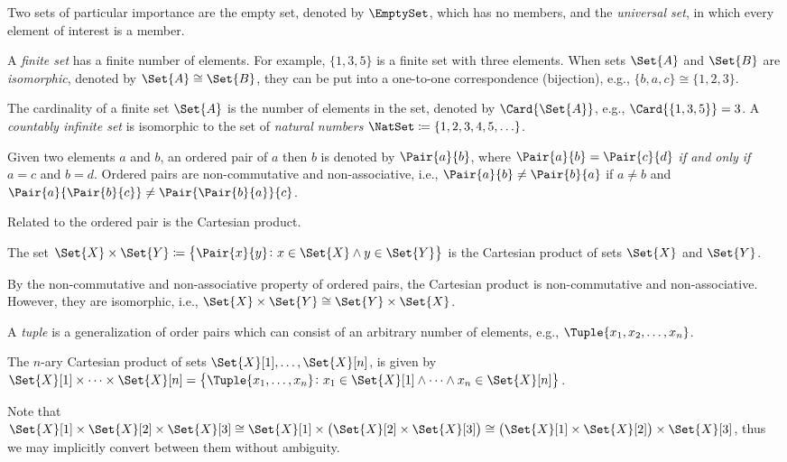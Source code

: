 \documentclass[10pt,final,hidelinks]{article}
\numberwithin{equation}{section}
\begin{document}
Two sets of particular importance are the empty set, denoted by $\EmptySet$, which has no members, and the \emph{universal set}, in which every element of interest is a member.

A \emph{finite set} has a finite number of elements.
For example, $\{ 1, 3, 5 \}$ is a finite set with three elements.
When sets $\Set{A}$ and $\Set{B}$ are \emph{isomorphic}, denoted by $\Set{A} 
\cong \Set{B}$, they can be put into a one-to-one correspondence (bijection), e.g., $\{b,a,c\} \cong \{1,2,3\}$.

The cardinality of a finite set $\Set{A}$ is the number of elements in the set, denoted by $\Card{\Set{A}}$, e.g., $\Card{\left\{ 1, 3, 5\right\}} = 3$.
A \emph{countably infinite set} is isomorphic to the set of \emph{natural numbers} $\NatSet \coloneqq \{1,2,3,4,5,\ldots\}$.


Given two elements $a$ and $b$, an ordered pair of $a$ then $b$ is denoted by $\Pair{a}{b}$, where $\Pair{a}{b} = \Pair{c}{d}$ \emph{if and only if} $a = c$ and $b = d$.
Ordered pairs are non-commutative and non-associative, i.e., $\Pair{a}{b} \neq \Pair{b}{a}$ if $a \neq b$ and $\Pair{a}{\Pair{b}{c}} \neq \Pair{\Pair{b}{a}}{c}$.

Related to the ordered pair is the Cartesian product.
\begin{definition}
	The set $\Set{X} \times \Set{Y} \coloneqq \left\{\Pair{x}{y} \colon x \in 
	\Set{X} \land y \in \Set{Y}\right\}$ is the Cartesian product of sets $\Set{X}$ 
	and $\Set{Y}$.
\end{definition}
By the non-commutative and non-associative property of ordered pairs, the Cartesian product is non-commutative and non-associative.
However, they are isomorphic, i.e., $\Set{X} \times \Set{Y} \cong \Set{Y} \times \Set{X}$.

A \emph{tuple} is a generalization of order pairs which can consist of an arbitrary number of elements, e.g., $\Tuple{x_1,x_2,\ldots,x_n}$.
\begin{definition}
	The $n$-ary Cartesian product of sets $\Set{X}[1],\ldots,\Set{X}[n]$, is given by $\Set{X}[1] \times \cdots \times \Set{X}[n] = \left\{\Tuple{x_1,\ldots,x_n} \colon x_1 \in \Set{X}[1] \land \cdots \land x_n \in \Set{X}[n]\right\}$.
\end{definition}
Note that
	$\Set{X}[1] \times \Set{X}[2] \times \Set{X}[3] \cong \Set{X}[1] \times \left(\Set{X}[2] \times \Set{X}[3]\right) \cong \left(\Set{X}[1] \times \Set{X}[2]\right) \times \Set{X}[3]$,
thus we may implicitly convert between them without ambiguity.
\end{document}
